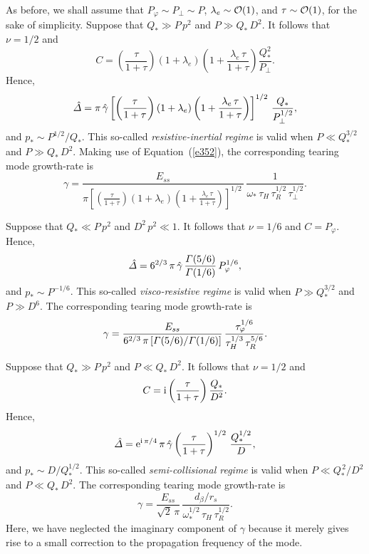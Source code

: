 \documentclass[notitlepage,12pt]{article}
\begin{document}
As before, we shall assume that $P_\varphi\sim P_\perp \sim P$, $\lambda_e\sim{\cal O}(1)$, and $\tau\sim {\cal O}(1)$, for
the sake of simplicity. 
Suppose that $Q_\ast\gg P\,p^2$ and $P\gg Q_\ast\,D^2$. It follows that $\nu=1/2$ and
\begin{equation}
C =\left(\frac{\tau}{1+\tau}\right) (1+\lambda_e)\left(1+\frac{\lambda_e\,\tau}{1+\tau}\right)\frac{Q_\ast^{2}}{P_\perp}.
\end{equation}
Hence, 
\begin{equation}
\hat{\mit\Delta} = \pi\,\hat{\gamma}\left[ \left(\frac{\tau}{1+\tau}\right)(1+\lambda_e)\left(1+\frac{\lambda_e\,\tau}{1+\tau}\right)\right]^{1/2}\,\frac{Q_\ast}{P_\perp^{1/2}},
\end{equation}
and $p_\ast\sim P^{1/2}/Q_\ast$. This so-called {\em resistive-inertial regime}\/ is valid when $P\ll Q_\ast^{3/2}$ and
$P\gg Q_\ast\,D^2$. 
Making use of Equation~(\ref{e352}), the corresponding tearing mode growth-rate is
\begin{equation}\label{e363}
\gamma = \frac{E_{ss}}{\pi\left[ \left(\frac{\tau}{1+\tau}\right)(1+\lambda_e)\left(1+\frac{\lambda_e\,\tau}{1+\tau}\right)\right]^{1/2}\,}\,\frac{1}{\omega_\ast\,\tau_H\,\tau_R^{1/2}\,\tau_\perp^{1/2}}.
\end{equation}

Suppose that $Q_\ast \ll P\,p^2$ and $D^2\,p^2\ll 1$. 
It follows that $\nu=1/6$ and
$C = P_\varphi$. 
Hence, 
\begin{equation}
\hat{\mit\Delta} = 6^{2/3}\,\pi\,\hat{\gamma}\, \frac{{\mit\Gamma}(5/6)}{{\mit\Gamma}(1/6)}\,P_\varphi^{1/6}, 
\end{equation}
and $p_\ast\sim P^{-1/6}$. This so-called {\em visco-resistive regime}\/ is valid when $P\gg Q_\ast^{3/2}$ and
$P\gg D^6$. 
The corresponding tearing mode growth-rate is
\begin{equation}\label{e365}
\gamma = \frac{E_{ss}}{6^{2/3}\,\pi\,[{\mit\Gamma}(5/6)/{\mit\Gamma}(1/6)]}\,\frac{\tau_\varphi^{1/6}}{\tau_H^{1/3}\,\tau_R^{5/6}}.
\end{equation}

Suppose that $Q_\ast\gg P\,p^2$ and $P\ll Q_\ast\,D^2$. It follows that $\nu=1/2$ and
\begin{equation}
C = {\rm i}\left(\frac{\tau}{1+\tau}\right)\frac{Q_\ast}{D^2}.
\end{equation} 
Hence, 
\begin{equation}
\hat{\mit\Delta} = {\rm e}^{{\rm i}\,\pi/4}\,\pi\,\hat{\gamma}\left(\frac{\tau}{1+\tau}\right)^{1/2}\,\frac{Q_\ast^{1/2}}{D},
\end{equation}
and $p_\ast\sim D/Q_\ast^{1/2}$. This so-called {\em semi-collisional regime}\/ is valid when $P\ll Q_\ast^{\,2}/D^2$ and
$P\ll Q_\ast\,D^2$. 
The corresponding tearing mode growth-rate is
\begin{equation}\label{e368}
\gamma = \frac{E_{ss}}{\sqrt{2}\,\pi}\,\frac{d_\beta/r_s}{\omega_\ast^{1/2}\,\tau_H\,\tau_R^{1/2}}.
\end{equation}
Here, we have neglected the imaginary component of $\gamma$ because it merely gives rise to a small correction to the
propagation frequency of the mode. 
\end{document}
